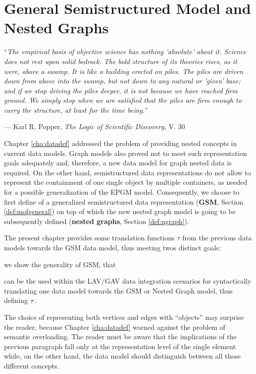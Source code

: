\chapter{General Semistructured Model and Nested Graphs}\label{cha:graphsdef}
\epigraph{``\textit{The empirical basis of objective science has nothing 'absolute' about it. Science does not rest upon solid bedrock. The bold structure of its theories rises, as it were, above a swamp. It is like a building erected on piles. The piles are driven down from above into the swamp, but not down to any natural or 'given' base; and if we stop driving the piles deeper, it is not because we have reached firm ground. We simply stop when we are satisfied that the piles are firm enough to carry the structure, at least for the time being.}''}{--- Karl R. Popper, \textit{The Logic of Scientific Discovery}, V. 30}

Chapter \vref{cha:datadef}  addressed the problem of providing nested concepts in current data models. Graph models also proved not to meet such representation goals adequately and, therefore, a new data model for graph nested data is required. On the other hand, semistructured data representations do not allow to represent the containment of one single object by multiple containers, as needed for a possible generalization of the EPGM model. Consequently, we choose to first define of a generalized semistructured data representation (\textbf{GSM}, Section \ref{def:mofgeneral}) on top of which the new nested graph model is going to be subsequently defined (\textbf{nested graphs}, Section \ref{def:ngraph}). 

The present chapter provides some translation functions $\tau$ from the previous data models towards the GSM data model, thus meeting twos distinct goals: \begin{mylist}
	\item we show the generality of GSM, that
	\item can be the used within the LAV/GAV   data integration scenarios for syntactically translating one data model towards the GSM or Nested Graph model, thus defining $\ttransl$.
\end{mylist}
The choice of representing both vertices and edges with ``objects'' may surprise the reader, because Chapter \ref{cha:datadef} warned against the problem of semantic overloading. The reader must be aware that the implications of the previous paragraph fall only at the representation level of the single element while, on the other hand, the data model should distinguish between all those different concepts.


